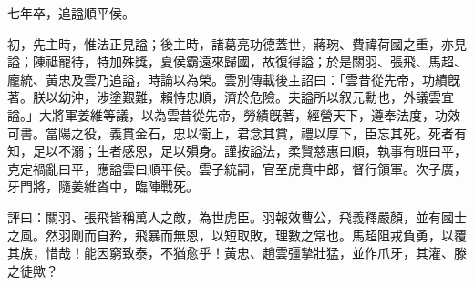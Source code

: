 \begin{pinyinscope}
七年卒，追謚順平侯。

初，先主時，惟法正見謚；後主時，諸葛亮功德蓋世，蔣琬、費禕荷國之重，亦見謚；陳祗寵待，特加殊獎，夏侯霸遠來歸國，故復得謚；於是關羽、張飛、馬超、龐統、黃忠及雲乃追謚，時論以為榮。雲別傳載後主詔曰：「雲昔從先帝，功績旣著。朕以幼沖，涉塗艱難，賴恃忠順，濟於危險。夫謚所以叙元勳也，外議雲宜謚。」大將軍姜維等議，以為雲昔從先帝，勞績旣著，經營天下，遵奉法度，功效可書。當陽之役，義貫金石，忠以衞上，君念其賞，禮以厚下，臣忘其死。死者有知，足以不溺；生者感恩，足以殞身。謹按謚法，柔賢慈惠曰順，執事有班曰平，克定禍亂曰平，應謚雲曰順平侯。雲子統嗣，官至虎賁中郎，督行領軍。次子廣，牙門將，隨姜維沓中，臨陣戰死。

評曰：關羽、張飛皆稱萬人之敵，為世虎臣。羽報效曹公，飛義釋嚴顏，並有國士之風。然羽剛而自矜，飛暴而無恩，以短取敗，理數之常也。馬超阻戎負勇，以覆其族，惜哉！能因窮致泰，不猶愈乎！黃忠、趙雲彊摯壯猛，並作爪牙，其灌、滕之徒歟？


\end{pinyinscope}
